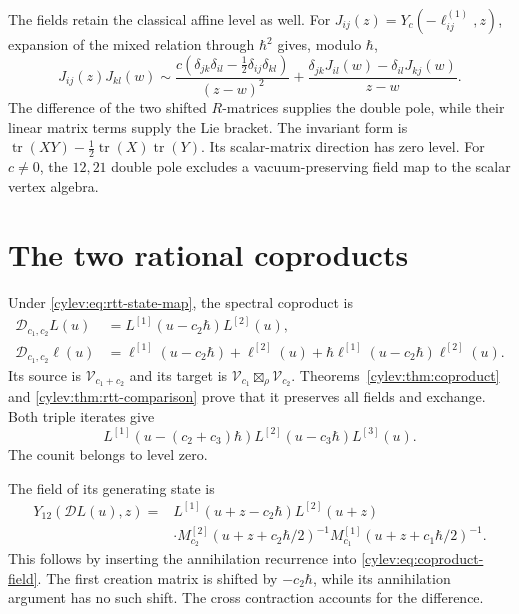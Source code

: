 The fields retain the classical affine level as well.
For $J_{ij}(z)=Y_c(-\ell_{ij}^{(1)},z)$, expansion of the mixed
relation through $\hbar^2$ gives, modulo $\hbar$,
\begin{equation}\label{cylev:eq:classical-affine}
 J_{ij}(z)J_{kl}(w)\sim
 \frac{c(\delta_{jk}\delta_{il}-\tfrac12\delta_{ij}\delta_{kl})}{(z-w)^2}
 +\frac{\delta_{jk}J_{il}(w)-\delta_{il}J_{kj}(w)}{z-w}.
\end{equation}
The difference of the two shifted $R$-matrices supplies the double
pole, while their linear matrix terms supply the Lie bracket.
The invariant form is
$\operatorname{tr}(XY)-\tfrac12\operatorname{tr}(X)\operatorname{tr}(Y)$.
Its scalar-matrix direction has zero level.
For $c\ne0$, the $12,21$ double pole excludes a vacuum-preserving
field map to the scalar vertex algebra.

\section{The two rational coproducts}

Under \eqref{cylev:eq:rtt-state-map}, the spectral coproduct is
\begin{align}
 \mathscr D_{c_1,c_2}L(u)
 &=L^{[1]}(u-c_2\hbar)L^{[2]}(u),
       \label{cylev:eq:spectral-coproduct}\\
 \mathscr D_{c_1,c_2}\ell(u)
 &=\ell^{[1]}(u-c_2\hbar)+\ell^{[2]}(u)
       +\hbar\ell^{[1]}(u-c_2\hbar)\ell^{[2]}(u).
       \nonumber
\end{align}
Its source is $\mathcal V_{c_1+c_2}$ and its target is
$\mathcal V_{c_1}\boxtimes_\rho\mathcal V_{c_2}$.
Theorems~\ref{cylev:thm:coproduct} and
\ref{cylev:thm:rtt-comparison} prove that it preserves all fields
and exchange. Both triple iterates give
\[
 L^{[1]}(u-(c_2+c_3)\hbar)L^{[2]}(u-c_3\hbar)L^{[3]}(u).
\]
The counit belongs to level zero.

The field of its generating state is
\begin{equation}\label{cylev:eq:coproduct-fields}
\begin{split}
 Y_{12}(\mathscr D L(u),z)
 ={}&L^{[1]}(u+z-c_2\hbar)L^{[2]}(u+z)\\
 &\cdot M_{c_2}^{[2]}(u+z+c_2\hbar/2)^{-1}
          M_{c_1}^{[1]}(u+z+c_1\hbar/2)^{-1}.
\end{split}
\end{equation}
This follows by inserting the annihilation recurrence into
\eqref{cylev:eq:coproduct-field}.
The first creation matrix is shifted by $-c_2\hbar$, while its
annihilation argument has no such shift. The cross contraction
accounts for the difference.


